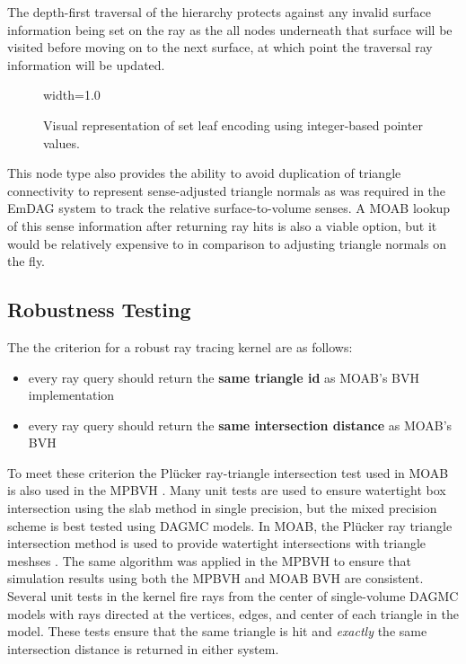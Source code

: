 The depth-first traversal of the hierarchy protects against
any invalid surface information being set on the ray as the all nodes underneath
that surface will be visited before moving on to the next surface, at which
point the traversal ray information will be updated.

\begin{figure}
  {width=1.0\textwidth}
  \caption{Visual representation of set leaf encoding using integer-based
    pointer values.}
  \label{fig:set_leaf_encoding}
\end{figure}

This node type also provides the ability to avoid duplication of triangle
connectivity to represent sense-adjusted triangle normals as was required in the
EmDAG system to track the relative surface-to-volume senses. A MOAB lookup of
this sense information after returning ray hits is also a viable option, but it
would be relatively expensive to in comparison to adjusting triangle normals on
the fly.

\subsection{Robustness Testing}

The the criterion for a robust ray tracing kernel are as follows:

\begin{itemize}
  \item every ray query should return the \textbf{same triangle id} as MOAB's BVH
    implementation
  \item every ray query should return the \textbf{same intersection distance} as MOAB's BVH
\end{itemize}

To meet these criterion the Pl\"{u}cker ray-triangle intersection test used in
MOAB is also used in the MPBVH \cite{Platis_2003}. Many unit tests are used to
ensure watertight box intersection using the slab method \cite{Kay_1986} in
single precision, but the mixed precision scheme is best tested using DAGMC
models. In MOAB, the Pl\"{u}cker ray triangle intersection method is used to provide
watertight intersections with triangle meshses \cite{Platis_2003}. The same
algorithm was applied in the MPBVH to ensure that simulation results using both
the MPBVH and MOAB BVH are consistent. Several unit tests in the kernel fire
rays from the center of single-volume DAGMC models with rays directed at
the vertices, edges, and center of each triangle in the model. These tests
ensure that the same triangle is hit and \textit{exactly} the same intersection
distance is returned in either system.

